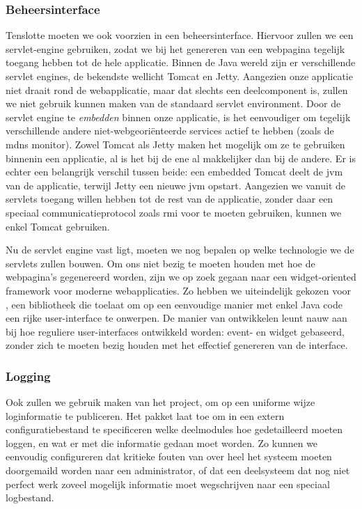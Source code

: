 \subsubsection{Beheersinterface}

Tenslotte moeten we ook voorzien in een beheersinterface. Hiervoor zullen we een servlet-engine gebruiken, zodat we bij het genereren van een webpagina tegelijk toegang hebben tot de hele applicatie. Binnen de Java wereld zijn er verschillende servlet engines, de bekendste wellicht Tomcat en Jetty. Aangezien onze applicatie niet draait rond de webapplicatie, maar dat slechts een deelcomponent is, zullen we niet gebruik kunnen maken van de standaard servlet environment. Door de servlet engine te \emph{embedden} binnen onze applicatie, is het eenvoudiger om tegelijk verschillende andere niet-webgeoriënteerde services actief te hebben (zoals de \ac{mdns} monitor). Zowel Tomcat als Jetty maken het mogelijk om ze te gebruiken binnenin een applicatie, al is het bij de ene al makkelijker dan bij de andere. Er is echter een belangrijk verschil tussen beide: een embedded Tomcat deelt de \ac{jvm} van de applicatie, terwijl Jetty een nieuwe \ac{jvm} opstart. Aangezien we vanuit de servlets toegang willen hebben tot de rest van de applicatie, zonder daar een speciaal communicatieprotocol zoals \ac{rmi} voor te moeten gebruiken, kunnen we enkel Tomcat gebruiken.

Nu de servlet engine vast ligt, moeten we nog bepalen op welke technologie we de servlets zullen bouwen. Om ons niet bezig te moeten houden met hoe de webpagina's gegenereerd worden, zijn we op zoek gegaan naar een widget-oriented framework voor moderne webapplicaties. Zo hebben we uiteindelijk gekozen voor , een bibliotheek die toelaat om op een eenvoudige manier met enkel Java code een rijke user-interface te onwerpen. De manier van ontwikkelen leunt nauw aan bij hoe reguliere user-interfaces ontwikkeld worden: event- en widget gebaseerd, zonder zich te moeten bezig houden met het effectief genereren van de interface.

\subsubsection{Logging}

Ook zullen we gebruik maken van het  project, om op een uniforme wijze loginformatie te publiceren. Het pakket laat toe om in een extern configuratiebestand te specificeren welke deelmodules hoe gedetailleerd moeten loggen, en wat er met die informatie gedaan moet worden. Zo kunnen we eenvoudig configureren dat kritieke fouten van over heel het systeem moeten doorgemaild worden naar een administrator, of dat een deelsysteem dat nog niet perfect werk zoveel mogelijk informatie moet wegschrijven naar een speciaal logbestand.

